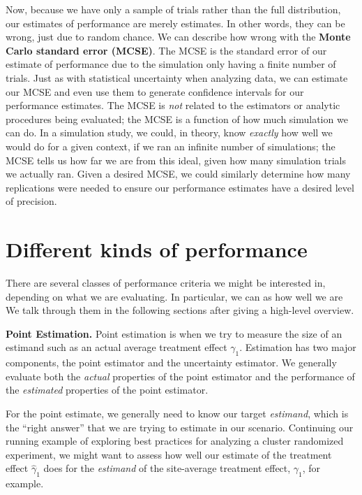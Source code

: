 \documentclass[
]{book}
\begin{document}
Now, because we have only a sample of trials rather than the full distribution, our estimates of performance are merely estimates.
In other words, they can be wrong, just due to random chance.
We can describe how wrong with the \textbf{Monte Carlo standard error (MCSE)}.
The MCSE is the standard error of our estimate of performance due to the simulation only having a finite number of trials.
Just as with statistical uncertainty when analyzing data, we can estimate our MCSE and even use them to generate confidence intervals for our performance estimates.
The MCSE is \emph{not} related to the estimators or analytic procedures being evaluated; the MCSE is a function of how much simulation we can do.
In a simulation study, we could, in theory, know \emph{exactly} how well we would do for a given context, if we ran an infinite number of simulations; the MCSE tells us how far we are from this ideal, given how many simulation trials we actually ran.
Given a desired MCSE, we could similarly determine how many replications were needed to ensure our performance estimates have a desired level of precision.

\section{Different kinds of performance}\label{different-kinds-of-performance}

There are several classes of performance criteria we might be interested in, depending on what we are evaluating.
In particular, we can as how well we are
We talk through them in the following sections after giving a high-level overview.

\textbf{Point Estimation.}
Point estimation is when we try to measure the size of an estimand such as an actual average treatment effect \(\gamma_1\).
Estimation has two major components, the point estimator and the uncertainty estimator.
We generally evaluate both the \emph{actual} properties of the point estimator and the performance of the \emph{estimated} properties of the point estimator.

For the point estimate, we generally need to know our target \emph{estimand}, which is the ``right answer'' that we are trying to estimate in our scenario.
Continuing our running example of exploring best practices for analyzing a cluster randomized experiment, we might want to assess how well our estimate of the treatment effect \(\hat\gamma_1\) does for the \emph{estimand} of the site-average treatment effect, \(\gamma_1\), for example.
\end{document}
